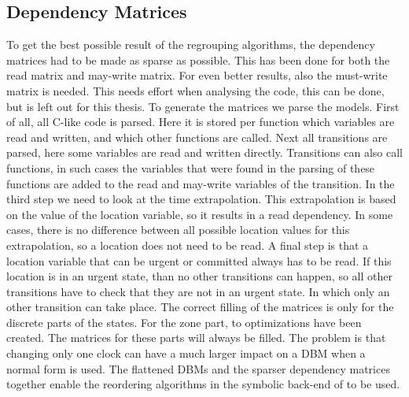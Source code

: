\subsection{Dependency Matrices}
\label{subsec:matrices}
To get the best possible result of the regrouping algorithms, the dependency matrices had to be made as sparse as possible. This has been done for both the read matrix and may-write matrix. For even better results, also the must-write matrix is needed. This needs effort when analysing the code, this can be done, but is left out for this thesis. To generate the matrices we parse the \uppaal{} models. First of all, all C-like code is parsed. Here it is stored per function which variables are read and written, and which other functions are called. Next all transitions are parsed, here some variables are read and written directly. Transitions can also call functions, in such cases the variables that were found in the parsing of these functions are added to the read and may-write variables of the transition. In the third step we need to look at the time extrapolation. This extrapolation is based on the value of the location variable, so it results in a read dependency. In some cases, there is no difference between all possible location values for this extrapolation, so a location does not need to be read. A final step is that a location variable that can be urgent or committed always has to be read. If this location is in an urgent state, than no other transitions can happen, so all other transitions have to check that they are not in an urgent state. In which only an other transition can take place.
The correct filling of the matrices is only for the discrete parts of the states. For the zone part, to optimizations have been created. The matrices for these parts will always be filled. The problem is that changing only one clock can have a much larger impact on a DBM when a normal form is used. The flattened DBMs and the sparser dependency matrices together enable the reordering algorithms in the symbolic back-end of \ltsmin{} to be used.

